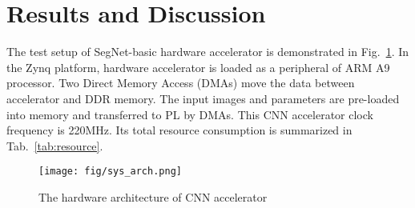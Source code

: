 \documentclass[conference]{IEEEtran}
\begin{document}
\section{Results and Discussion}\label{sec:Results}
\begin{comment}
The overview of hardware architecture is shown in Fig.~\ref{fig:sys_arch}. This CNN accelerator is loaded as a peripheral of the ARM A9 processor. So that ARM A9 processor could configure CNN accelerator via AXI4 lite bus. Through the dedicated High-Performance Ports (HPs) on Zynq, intermediate data is transmitted between DDR memory and the CNN accelerator by two Scatter-Gather Direct Memory Access (DMAs). Three buffers, weight buffer, IF buffer and OF buffer, are equipped on CNN accelerator. Among them, double buffering technique is deployed on the IF buffer, to boost the throughput.
\end{comment}

The test setup of SegNet-basic hardware accelerator is demonstrated in Fig.~\ref{fig:sys_arch}. In the Zynq platform, hardware accelerator is loaded as a peripheral of ARM A9 processor. Two Direct Memory Access (DMAs) move the data between accelerator and DDR memory. The input images and parameters are pre-loaded into memory and transferred to PL by DMAs. This CNN accelerator clock frequency is 220MHz. Its total resource consumption is summarized in Tab.~\ref{tab:resource}.
\begin{figure}[htbp]
	\centering
	\texttt{[image: fig/sys\_arch.png]}
	\caption{The hardware architecture of CNN accelerator}
	\label{fig:sys_arch}
\end{figure}

\begin{comment}
Xilinx ZC706 development kit is chosen to be the target FPGA platform for testing. A Zynq XC7Z045 SoC, two 1GB DDR3 SDRAMs on both programmable logic (PL) and processing system (PS) sides respectively, are mounted on the board. 
Inside Zynq XC7Z045 SoC is consists of a dual-core ARM Cortex-A9 processor on PS side, and 437,200 registers, 218,600 Look-Up Tables (LUTs),  19.2Mb Block RAMs, 900 DSP Slices on PL side.
\end{comment}

\begin{comment}
: 8929(XXX\%) registers, 10831(XXX\%) LUTs, 432(XXX\%) BRAMs and 576(XXX\%) DSP Slices, when running at XXX MHz. The resource and performance comparison are 
\end{comment}
\end{document}
